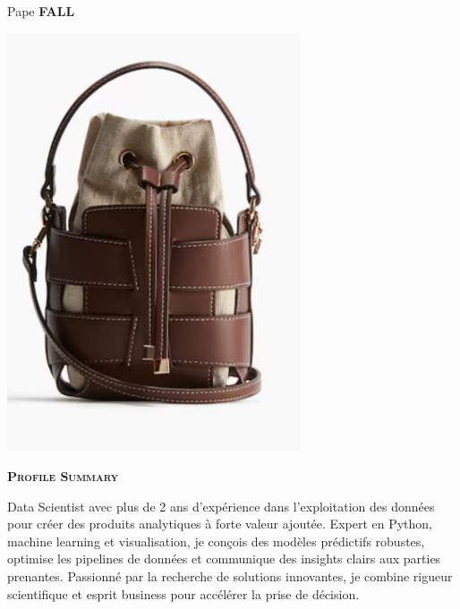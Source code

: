 \documentclass[11pt,a4paper]{article}
\newcommand{\headleft}[1]{\vspace*{3ex}\textsc{\textbf{#1}}\par%
    \vspace*{-1.5ex}\hrulefill\par\vspace*{0.7ex}}
\begin{document}
\setlength{\topskip}{0pt}\setlength{\parindent}{0pt}\setlength{\parskip}{0pt}
\setlength{\fboxsep}{0pt}\pagestyle{empty}\raggedbottom

\begin{minipage}[t]{0.33\textwidth}
\colorbox{cvblue}{\begin{minipage}[t][5mm][t]{\textwidth}\null\hfill\null\end{minipage}}
\vspace{-.2ex}
\colorbox{cvblue!90}{\color{white}
\textwidth
\begin{minipage}[t][293mm][t]{0.82\textwidth}\raggedright
\vspace*{2.5ex}

\Large Pape \textbf{\textsc{FALL}} \normalsize

\null\hfill\includegraphics[width=0.65\textwidth]{49a2e5607d8440b7b0c5f743b57afca8.png}\hfill\null

\vspace*{0.5ex}

\headleft{Profile Summary}
Data Scientist avec plus de 2 ans d’expérience dans l’exploitation des données pour créer des produits analytiques à forte valeur ajoutée. Expert en Python, machine learning et visualisation, je conçois des modèles prédictifs robustes, optimise les pipelines de données et communique des insights clairs aux parties prenantes. Passionné par la recherche de solutions innovantes, je combine rigueur scientifique et esprit business pour accélérer la prise de décision.


\end{minipage}}
\end{minipage}
\end{document}
